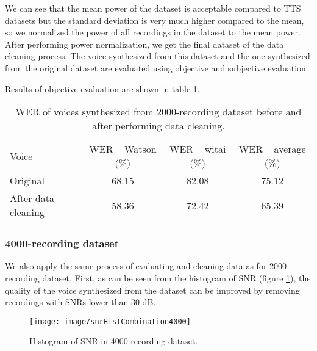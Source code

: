 \documentclass[12pt]{article}
\begin{document}
We can see that the mean power of the dataset is acceptable compared to TTS datasets but the standard deviation is very much higher compared to the mean, so we normalized the power of all recordings in the dataset to the mean power. After performing power normalization, we get the final dataset of the data cleaning process. The voice synthesized from this dataset and the one synthesized from the original dataset are evaluated using objective and subjective evaluation.

Results of objective evaluation are shown in table \ref{tab_werCombination2000}.

\begin{table}[]
\begin{center}
\caption{WER of voices synthesized from 2000-recording dataset before and after performing data cleaning.}
\label{tab_werCombination2000}
\vspace{3mm}
\begin{tabular}{lccc}
\hline
Voice & WER – Watson (\%) & WER – witai (\%) & WER – average (\%)\\
\cmidrule(l{0pt}r{2pt}){1-1}\cmidrule(l{0pt}r{2pt}){2-2}\cmidrule(l{0pt}r{2pt}){3-3}\cmidrule(l{0pt}r{2pt}){4-4}
Original            & 68.15 & 82.08 & 75.12 \\
After data cleaning & 58.36 & 72.42 & 65.39 \\
\hline
\end{tabular}
\end{center}
\end{table}

\subsubsection{4000-recording dataset}
We also apply the same process of evaluating and cleaning data as for 2000-recording dataset. First, as can be seen from the histogram of SNR (figure \ref{fig_snrHistCombination4000}), the quality of the voice synthesized from the dataset can be improved by removing recordings with SNRs lower than 30 dB.

\begin{figure}[t]
\begin{center}
\texttt{[image: image/snrHistCombination4000]}
\end{center}
\vspace{-0.3cm}
\caption[SNR hist combination 4000.]{Histogram of SNR in 4000-recording dataset.}
\label{fig_snrHistCombination4000}
\end{figure}
\end{document}

